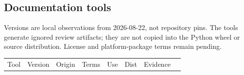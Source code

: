 \documentclass[
  letterpaper,
]{article}
\newcounter{none} %
\begin{document}
\begin{landscape}
\end{landscape}

\begin{landscape}

\subsection{Documentation tools}\label{documentation-tools}

Versions are local observations from 2026-08-22, not repository pins. The tools generate ignored review artifacts; they
are not copied into the Python wheel or source distribution. License and platform-package terms remain pending.

{\def\LTcaptype{none} %
\begin{longtable}[]{@{}
  >{\raggedright\arraybackslash}p{}
  >{\raggedright\arraybackslash}p{}
  >{\raggedright\arraybackslash}p{}
  >{\raggedright\arraybackslash}p{}
  >{\raggedright\arraybackslash}p{}
  >{\raggedright\arraybackslash}p{}
  >{\raggedright\arraybackslash}p{}
  >{\raggedright\arraybackslash}p{}@{}}
\toprule\noalign{}
\begin{minipage}[b]{\linewidth}\raggedright
Tool
\end{minipage} & \begin{minipage}[b]{\linewidth}\raggedright
Version
\end{minipage} & \begin{minipage}[b]{\linewidth}\raggedright
Origin
\end{minipage} & \begin{minipage}[b]{\linewidth}\raggedright
Terms
\end{minipage} & \begin{minipage}[b]{\linewidth}\raggedright
Use
\end{minipage} & \begin{minipage}[b]{\linewidth}\raggedright
Dist
\end{minipage} & \begin{minipage}[b]{\linewidth}\raggedright
Evidence
\end{minipage} & \begin{minipage}[b]{\linewidth}\raggedright

\end{minipage}
\end{longtable}}
\end{landscape}
\end{document}
